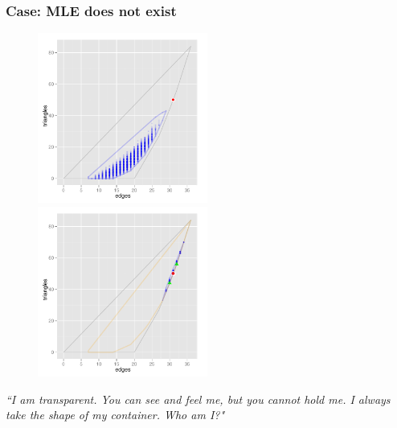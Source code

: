 \documentclass[ 10pt]{beamer}
\newcommand{\yobs}{y_{\text{obs}}}
\begin{document}
\frame
{
\frametitle{Case: MLE does not exist}  
\begin{figure}[h]
\centering
\includegraphics[height=2.2in]{MCsample-boundary}
\includegraphics[height=2.2in]{MCsample-77face}
\label{F:MCsample-MLE nonexistent}
\end{figure}
\pause
\emph{``I am transparent. You can see and feel me, but you cannot hold me. I always take the shape of my container. Who am I?"}
}
%
%
%
\end{document}
